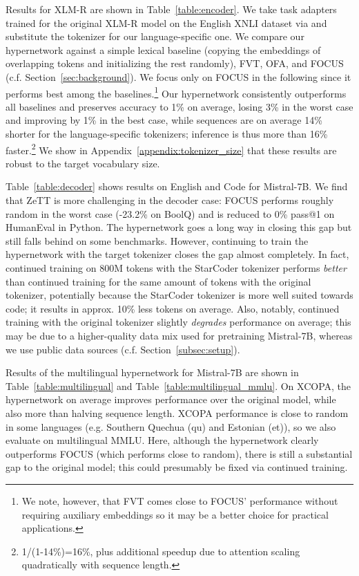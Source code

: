 \documentclass{article}
\begin{document}
Results for XLM-R are shown in Table~\ref{table:encoder}. We take task adapters trained for the original XLM-R model on the English XNLI dataset via \citet{poth-etal-2023-adapters} and substitute the tokenizer for our language-specific one. We compare our hypernetwork against a simple lexical baseline (copying the embeddings of overlapping tokens and initializing the rest randomly), FVT, OFA, and FOCUS (c.f. Section~\ref{sec:background}). We focus only on FOCUS in the following since it performs best among the baselines.\footnote{We note, however, that FVT comes close to FOCUS' performance without requiring auxiliary embeddings so it may be a better choice for practical applications.} Our hypernetwork consistently outperforms all baselines and preserves accuracy to 1\% on average, losing 3\% in the worst case and improving by 1\% in the best case, while sequences are on average 14\% shorter for the language-specific tokenizers; inference is thus more than 16\% faster.\footnote{1/(1-14\%)=16\%, plus additional speedup due to attention scaling quadratically with sequence length.} We show in Appendix~\ref{appendix:tokenizer_size} that these results are robust to the target vocabulary size.

Table~\ref{table:decoder} shows results on English and Code for Mistral-7B. We find that ZeTT is more challenging in the decoder case: FOCUS performs roughly random in the worst case (-23.2\% on BoolQ) and is reduced to 0\% pass@1 on HumanEval in Python.
The hypernetwork goes a long way in closing this gap but still falls behind on some benchmarks. However, continuing to train the hypernetwork with the target tokenizer closes the gap almost completely. In fact, continued training on 800M tokens with the StarCoder tokenizer performs \textit{better} than continued training for the same amount of tokens with the original tokenizer, potentially because the StarCoder tokenizer is more well suited towards code; it results in approx. 10\% less tokens on average. Also, notably, continued training with the original tokenizer slightly \textit{degrades} performance on average; this may be due to a higher-quality data mix used for pretraining Mistral-7B, whereas we use public data sources (c.f. Section~\ref{subsec:setup}).

Results of the multilingual hypernetwork for Mistral-7B are shown in Table~\ref{table:multilingual} and Table~\ref{table:multilingual_mmlu}. On XCOPA, the hypernetwork on average improves performance over the original model, while also more than halving sequence length. XCOPA performance is close to random in some languages (e.g. Southern Quechua (qu) and Estonian (et)), so we also evaluate on multilingual MMLU. Here, although the hypernetwork clearly outperforms FOCUS (which performs close to random), there is still a substantial gap to the original model; this could presumably be fixed via continued training.
\end{document}
